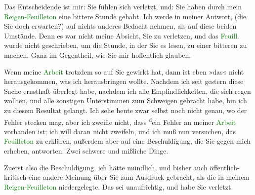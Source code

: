 \pstart
           Das Entscheidende ist mir: Sie fühlen sich verletzt, und: Sie haben durch mein \textcolor{green}{Reigen-Feuilleton}{}\ledrightnote{{$\rightarrow$}\textcolor{green}{Arthur Schnitzler und sein »Reigen«}} eine bittere
               Stunde gehabt. Ich werde in meiner Antwort, (die Sie doch erwarten?) auf nichts
               anderes Bedacht nehmen, als auf diese beiden Umstände. Denn es war nicht meine
               Absicht, Sie zu verletzen, und das \textcolor{green}{Feuill.}{}\ledrightnote{{$\rightarrow$}\textcolor{green}{Arthur Schnitzler und sein »Reigen«}} wurde nicht geschrieben, um die Stunde, in der Sie es lesen, zu
               einer bitteren zu machen. Ganz im Gegentheil, wie Sie mir hoffentlich glauben.\pend
           
\pstart
           Wenn meine \textcolor{green}{Arbeit}{}\ledrightnote{{$\rightarrow$}\textcolor{green}{Arthur Schnitzler und sein »Reigen«}} trotzdem so
               auf Sie gewirkt hat, dann ist eben »das« nicht herausgekommen, was ich herausbringen
               wollte. Nachdem ich seit gestern diese Sache ernsthaft
               überlegt habe, nachdem ich alle Empfindlichkeiten, die sich regen wollten, und alle
               sonstigen Unterstimmen zum Schweigen gebracht habe, bin ich zu diesem Resultat
               gelangt. Ich sehe heute zwar selbst noch nicht genau,
               wo der Fehler stecken mag, aber ich zweifle nicht, dass \substVorne{}\textsuperscript{d}\substDazwischen{}e\substHinten{}in Fehler an meiner \textcolor{green}{Arbeit}{}\ledrightnote{{$\rightarrow$}\textcolor{green}{Arthur Schnitzler und sein »Reigen«}} vorhanden ist; ich \uline{will} daran nicht
               zweifeln, und ich muß nun versuchen, das \textcolor{green}{Feuilleton}{}\ledrightnote{{$\rightarrow$}\textcolor{green}{Arthur Schnitzler und sein »Reigen«}} zu erklären, außerdem aber auf eine
               Beschuldigung, die Sie gegen mich erheben, antworten. Zwei schwere und  mißliche Dinge.\pend
           
\pstart
           Zuerst also die Beschuldigung\textcolor{gray}{,} ich hätte mündlich, und bisher auch
               öffentlich-kritisch eine andere Meinung über Sie zum Ausdruck gebracht, als die in
               meinem \textcolor{green}{Reigen-Feuilleton}{}\ledrightnote{{$\rightarrow$}\textcolor{green}{Arthur Schnitzler und sein »Reigen«}}
               niedergelegte. Das sei unaufrichtig, und habe Sie verletzt.\pend
           
